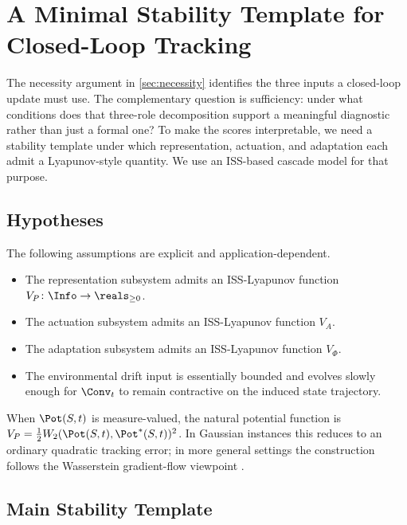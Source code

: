 \section{A Minimal Stability Template for Closed-Loop Tracking}\label{sec:sufficiency}

The necessity argument in \cref{sec:necessity} identifies the three inputs a
closed-loop update must use. The complementary question is sufficiency: under
what conditions does that three-role decomposition support a meaningful
diagnostic rather than just a formal one? To make the scores interpretable, we
need a stability template under which representation, actuation, and adaptation
each admit a Lyapunov-style quantity. We use an ISS-based cascade model for
that purpose.

\subsection{Hypotheses}

The following assumptions are explicit and application-dependent.

\begin{itemize}
\item[\textbf{(H-ISS-P)}] The representation subsystem admits an ISS-Lyapunov
  function $V_P\colon\Info\to\reals_{\geq 0}$.
\item[\textbf{(H-ISS-A)}] The actuation subsystem admits an ISS-Lyapunov
  function $V_A$.
\item[\textbf{(H-ISS-$\Phi$)}] The adaptation subsystem admits an ISS-Lyapunov
  function $V_\Phi$.
\item[\textbf{(H-ISS-Env)}] The environmental drift input is essentially
  bounded and evolves slowly enough for $\Conv_t$ to remain contractive on the
  induced state trajectory.
\end{itemize}

\begin{remark}\label{rem:jko}
When $\Pot(S,t)$ is measure-valued, the natural potential function is
$V_P = \tfrac{1}{2}W_2(\Pot(S,t),\Pot^*(S,t))^2$. In Gaussian instances this
reduces to an ordinary quadratic tracking error; in more general settings the
construction follows the Wasserstein gradient-flow viewpoint
\citep{AmbrosioGigliSavare2005,MironchenkoP2020}.
\end{remark}

\subsection{Main Stability Template}

